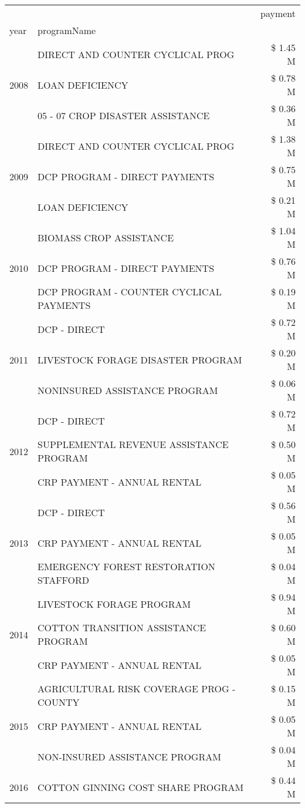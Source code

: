 \begin{tabular}{llr}
\toprule
 &  & payment \\
year & programName &  \\
\midrule
\multirow[t]{3}{*}{2008} & DIRECT AND COUNTER CYCLICAL PROG & \$ 1.45 M \\
 & LOAN DEFICIENCY & \$ 0.78 M \\
 & 05 - 07 CROP DISASTER ASSISTANCE & \$ 0.36 M \\
\cline{1-3}
\multirow[t]{3}{*}{2009} & DIRECT AND COUNTER CYCLICAL PROG & \$ 1.38 M \\
 & DCP PROGRAM - DIRECT PAYMENTS & \$ 0.75 M \\
 & LOAN DEFICIENCY & \$ 0.21 M \\
\cline{1-3}
\multirow[t]{3}{*}{2010} & BIOMASS CROP ASSISTANCE & \$ 1.04 M \\
 & DCP PROGRAM - DIRECT PAYMENTS & \$ 0.76 M \\
 & DCP PROGRAM - COUNTER CYCLICAL PAYMENTS & \$ 0.19 M \\
\cline{1-3}
\multirow[t]{3}{*}{2011} & DCP - DIRECT & \$ 0.72 M \\
 & LIVESTOCK FORAGE DISASTER PROGRAM & \$ 0.20 M \\
 & NONINSURED ASSISTANCE PROGRAM & \$ 0.06 M \\
\cline{1-3}
\multirow[t]{3}{*}{2012} & DCP - DIRECT & \$ 0.72 M \\
 & SUPPLEMENTAL REVENUE ASSISTANCE PROGRAM & \$ 0.50 M \\
 & CRP PAYMENT - ANNUAL RENTAL & \$ 0.05 M \\
\cline{1-3}
\multirow[t]{3}{*}{2013} & DCP - DIRECT & \$ 0.56 M \\
 & CRP PAYMENT - ANNUAL RENTAL & \$ 0.05 M \\
 & EMERGENCY FOREST RESTORATION STAFFORD & \$ 0.04 M \\
\cline{1-3}
\multirow[t]{3}{*}{2014} & LIVESTOCK FORAGE PROGRAM & \$ 0.94 M \\
 & COTTON TRANSITION ASSISTANCE PROGRAM & \$ 0.60 M \\
 & CRP PAYMENT - ANNUAL RENTAL & \$ 0.05 M \\
\cline{1-3}
\multirow[t]{3}{*}{2015} & AGRICULTURAL RISK COVERAGE PROG - COUNTY & \$ 0.15 M \\
 & CRP PAYMENT - ANNUAL RENTAL & \$ 0.05 M \\
 & NON-INSURED ASSISTANCE PROGRAM & \$ 0.04 M \\
\cline{1-3}
\multirow[t]{3}{*}{2016} & COTTON GINNING COST SHARE PROGRAM             & \$ 0.44 M \\

\end{tabular}
